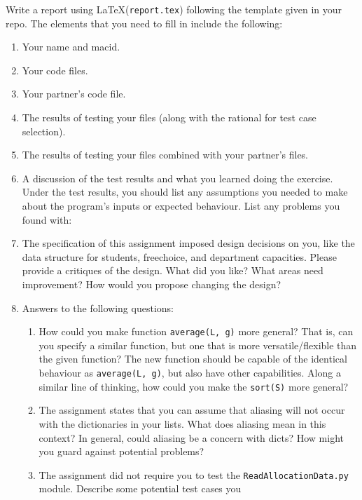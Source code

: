 \documentclass[12pt]{article}
\newcommand{\latex}{\LaTeX\xspace}
\begin{document}
Write a report using \latex (\texttt{report.tex}) following the template given in
your repo.  The elements that you need to fill in include the following:

\begin{enumerate}
\item Your name and macid.
\item Your code files.
\item Your partner's code file.
\item The results of testing your files (along with the rational for test case selection).
\item The results of testing your files combined with your partner's files.
\item A discussion of the test results and what you learned doing the exercise.
  Under the test results, you should list any assumptions you needed to make
  about the program's inputs or expected behaviour.  List any problems you found
  with:
\item The specification of this assignment imposed design decisions on you, like
  the data structure for students, freechoice, and department capacities.  Please
  provide a critiques of the design.  What did you like?  What areas need
  improvement?  How would you propose changing the design?
\item Answers to the following questions:
\begin{enumerate}
\item How could you make function {\tt average(L, g)} more general?  That is,
  can you specify a similar function, but one that is more versatile/flexible
  than the given function?  The new function should be capable of the identical
  behaviour as \texttt{average(L, g)}, but also have other capabilities.  Along
  a similar line of thinking, how could you make the \texttt{sort(S)} more
  general?
\item The assignment states that you can assume that aliasing will not occur with
  the dictionaries in your lists.  What does aliasing mean in this context?  In
  general, could aliasing be a concern with dicts?  How might you guard against
  potential problems?
\item The assignment did not require you to test the
  \texttt{ReadAllocationData.py} module.  Describe some potential test cases you

\end{enumerate}
\end{enumerate}
\end{document}
